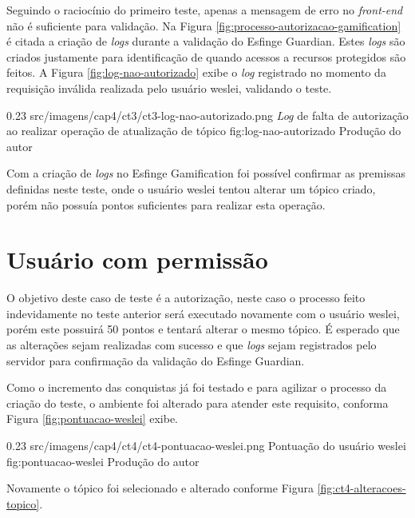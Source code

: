 \par Seguindo o raciocínio do primeiro teste, apenas a mensagem de erro no \textit{front-end} não é suficiente para validação. Na Figura \ref{fig:processo-autorizacao-gamification} é citada a criação de \textit{logs} durante a validação do Esfinge Guardian. Estes \textit{logs} são criados justamente para identificação de quando acessos a recursos protegidos são feitos. A Figura \ref{fig:log-nao-autorizado} exibe o \textit{log} registrado no momento da requisição inválida realizada pelo usuário weslei, validando o teste.

\begin{image}
{0.23}
{src/imagens/cap4/ct3/ct3-log-nao-autorizado.png}
{\textit{Log} de falta de autorização ao realizar operação de atualização de tópico}
{fig:log-nao-autorizado}
{Produção do autor}
\end{image}

\par Com a criação de \textit{logs} no Esfinge Gamification foi possível confirmar as premissas definidas neste teste, onde o usuário weslei tentou alterar um tópico criado, porém não possuía pontos suficientes para realizar esta operação.

\section{Usuário com permissão}

\par O objetivo deste caso de teste é a autorização, neste caso o processo feito indevidamente no teste anterior será executado novamente com o usuário weslei, porém este possuirá 50 pontos e tentará alterar o mesmo tópico. É esperado que as alterações sejam realizadas com sucesso e que \textit{logs} sejam registrados pelo servidor para confirmação da validação do Esfinge Guardian.

\par Como o incremento das conquistas já foi testado e para agilizar o processo da criação do teste, o ambiente foi alterado para atender este requisito, conforma Figura \ref{fig:pontuacao-weslei} exibe.

\begin{image}
{0.23}
{src/imagens/cap4/ct4/ct4-pontuacao-weslei.png}
{Pontuação do usuário weslei}
{fig:pontuacao-weslei}
{Produção do autor}
\end{image}

\par Novamente o tópico foi selecionado e alterado conforme Figura \ref{fig:ct4-alteracoes-topico}.

